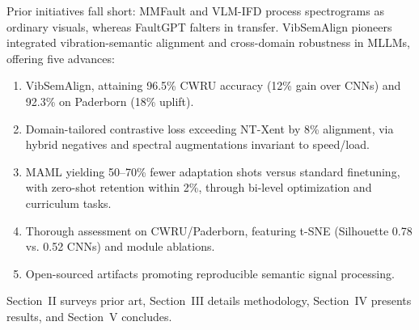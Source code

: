Prior initiatives fall short: MMFault \cite{cite23} and VLM-IFD \cite{cite24} process spectrograms as ordinary visuals, whereas FaultGPT \cite{cite26} falters in transfer. VibSemAlign pioneers integrated vibration-semantic alignment and cross-domain robustness in MLLMs, offering five advances:
\begin{enumerate}
\item VibSemAlign, attaining 96.5\% CWRU accuracy (12\% gain over CNNs) and 92.3\% on Paderborn (18\% uplift).
\item Domain-tailored contrastive loss exceeding NT-Xent by 8\% alignment, via hybrid negatives and spectral augmentations invariant to speed/load.
\item MAML yielding 50--70\% fewer adaptation shots versus standard finetuning, with zero-shot retention within 2\%, through bi-level optimization and curriculum tasks.
\item Thorough assessment on CWRU/Paderborn, featuring t-SNE (Silhouette 0.78 vs. 0.52 CNNs) and module ablations.
\item Open-sourced artifacts promoting reproducible semantic signal processing.
\end{enumerate}

Section~II surveys prior art, Section~III details methodology, Section~IV presents results, and Section~V concludes.